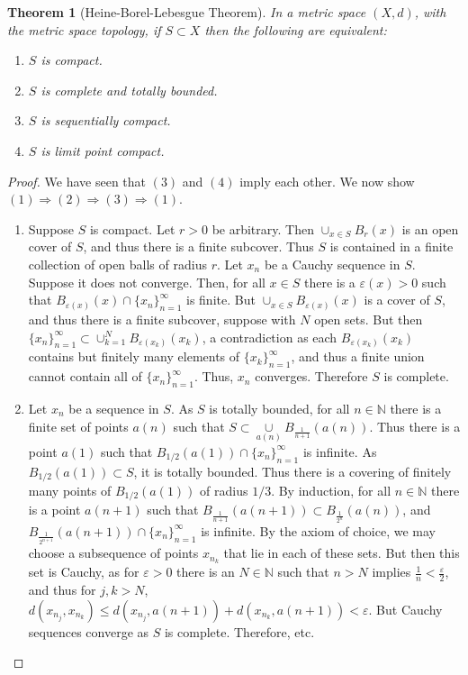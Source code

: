 \documentclass[12pt,oneside]{book}
\theoremstyle{mystyle}
\newtheorem{theorem}{Theorem}[section]
\begin{document}
\begin{theorem}[Heine-Borel-Lebesgue Theorem]
In a metric space $(X,d)$, with the metric space topology, if $S\subset X$ then the following are equivalent:
\begin{enumerate}
\item $S$ is compact.
\item $S$ is complete and totally bounded.
\item $S$ is sequentially compact.
\item $S$ is limit point compact.
\end{enumerate}
\end{theorem}
\begin{proof}
We have seen that $(3)$ and $(4)$ imply each other. We now show $(1)\Rightarrow (2)\Rightarrow (3) \Rightarrow (1)$.
\begin{enumerate}
\item Suppose $S$ is compact. Let $r>0$ be arbitrary. Then $\cup_{x\in S}B_{r}(x)$ is an open cover of $S$, and thus there is a finite subcover. Thus $S$ is contained in a finite collection of open balls of radius $r$. Let $x_n$ be a Cauchy sequence in $S$. Suppose it does not converge. Then, for all $x\in S$ there is a $\varepsilon(x)>0$ such that $B_{\varepsilon(x)}(x)\cap \{x_n\}_{n=1}^{\infty}$ is finite. But $\cup_{x\in S}B_{\varepsilon(x)}(x)$ is a cover of $S$, and thus there is a finite subcover, suppose with $N$ open sets. But then $\{x_n\}_{n=1}^{\infty}\subset \cup_{k=1}^{N}B_{\varepsilon(x_k)}(x_k)$, a contradiction as each $B_{\varepsilon(x_k)}(x_k)$ contains but finitely many elements of $\{x_k\}_{n=1}^{\infty}$, and thus a finite union cannot contain all of $\{x_n\}_{n=1}^{\infty}$. Thus, $x_n$ converges. Therefore $S$ is complete.
\item Let $x_n$ be a sequence in $S$. As $S$ is totally bounded, for all $n\in \mathbb{N}$ there is a finite set of points $a(n)$ such that $S\subset \underset{a(n)}\cup B_{\frac{1}{n+1}}(a(n))$. Thus there is a point $a(1)$ such that $B_{1/2}(a(1))\cap \{x_n\}_{n=1}^{\infty}$ is infinite. As $B_{1/2}(a(1))\subset S$, it is totally bounded. Thus there is a covering of finitely many points of $B_{1/2}(a(1))$ of radius $1/3$. By induction, for all $n\in \mathbb{N}$ there is a point $a(n+1)$ such that $B_{\frac{1}{n+1}}(a(n+1))\subset B_{\frac{1}{2^{n}}}(a(n))$, and $B_{\frac{1}{2^{n+1}}}(a(n+1))\cap \{x_n\}_{n=1}^{\infty}$ is infinite. By the axiom of choice, we may choose a subsequence of points $x_{n_k}$ that lie in each of these sets. But then this set is Cauchy, as for $\varepsilon>0$ there is an $N\in \mathbb{N}$ such that $n>N$ implies $\frac{1}{n}<\frac{\varepsilon}{2}$, and thus for $j,k>N$, $d(x_{n_j},x_{n_k})\leq d(x_{n_j},a(n+1))+d(x_{n_k},a(n+1))<\varepsilon$. But Cauchy sequences converge as $S$ is complete. Therefore, etc.

\end{enumerate}
\end{proof}
\end{document}

